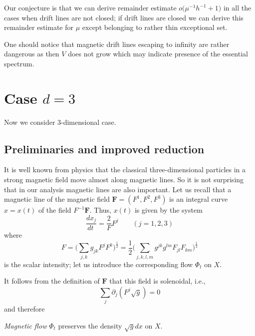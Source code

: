 \documentclass[12pt,oneside,openany,article]{memoir}
\numberwithin{equation}{chapter}
\theoremstyle{plain}
\theoremstyle{definition}
\theoremstyle{remark}
\numberwithin{equation}{chapter}
\newenvironment{claim}[1][{\textup{(\theequation)}}]{\refstepcounter{equation}\vglue10pt
\begin{trivlist}
\item[{\hskip\labelsep#1}]}{\vglue10pt\end{trivlist}}
\begin{document}
Our conjecture is that we can derive remainder estimate $o\bigl(\mu^{-1}h^{-1}+1\bigr)$ in all the cases when drift lines are not closed; if drift lines are closed we can derive this remainder estimate for $\mu$ except belonging to rather thin exceptional set.

One should notice that magnetic drift lines escaping to infinity are rather dangerous as then $V$ does not grow which may indicate presence of the essential spectrum.

\chapter{Case $d=3$}
\label{sect-13-6-2}

Now we consider $3$-dimensional case.

\section{Preliminaries and improved reduction}
\label{sect-13-6-2-1}
It is well known from physics that the classical three-dimensional particles in a strong magnetic field move almost along magnetic lines.
So it is not surprising that in our analysis magnetic lines are also important. Let us recall that a magnetic line of the magnetic field $\mathbf{F}=(F^1,F^2,F^3)$ is an integral curve $x=x(t)$ of the field
$F^{-1}\mathbf{F}$. Thus, $x(t)$ is given by the system
\begin{equation}
{\frac{dx_j}{dt\ }}={\frac{2}{F}}F^j\qquad (j=1,2,3)
\label{13-6-32}
\end{equation}
where
\begin{equation}
F=\bigl( \sum_{j,k} g_{jk}F^jF^k\bigr)^{\frac{1}{2}}=
\frac{1}{2} \bigl(\sum_{j,k,l,m} g^{jk}g^{lm}F_{jl}F_{km}\bigr)^{\frac{1}{2}}
\label{13-6-33}
\end{equation}
is the scalar intensity; let us introduce the corresponding flow $\Phi _t$ on $X$.

It follows from the definition of $\mathbf{F}$ that this field is solenoidal, i.e.,
\begin{equation}
\sum_{j}\partial _j(F^j\sqrt{g})=0
\label{13-6-34}
\end{equation}
and therefore
\begin{claim}\label{13-6-35}\emph{Magnetic flow\/} $\Phi_t$ preserves the density $\sqrt{g}dx$ on $X$.
\end{claim}
\end{document}
